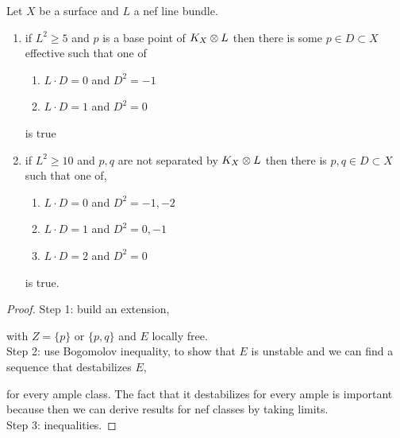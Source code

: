 \documentclass[12pt]{article}
\begin{document}
\begin{theorem}
Let $X$ be a surface and $L$ a nef line bundle.
\begin{enumerate}
\item if $L^2 \ge 5$ and $p$ is a base point of $K_X \otimes L$ then there is some $p \in D \subset X$ effective such that one of
\begin{enumerate}
\item $L \cdot D = 0$ and $D^2 = -1$
\item $L \cdot D = 1$ and $D^2 = 0$
\end{enumerate}
is true

\item if $L^2 \ge 10$ and $p,q$ are not separated by $K_X \otimes L$ then there is $p,q \in D \subset X$ such that one of,
\begin{enumerate}
\item $L \cdot D = 0$ and $D^2 = -1,-2$
\item $L \cdot D = 1$ and $D^2 = 0,-1$
\item $L \cdot D = 2$ and $D^2 = 0$ 
\end{enumerate}
is true.
\end{enumerate}
\end{theorem}

\begin{proof}
Step 1: build an extension,
\begin{center}
\end{center}
with $Z = \{ p \}$ or $\{p, q \}$ and $E$ locally free.
\bigskip\\
Step 2: use Bogomolov inequality, to show that $E$ is unstable and we can find a sequence that destabilizes $E$,
\begin{center}
\end{center}
for every ample class. The fact that it destabilizes for every ample is important because then we can derive results for nef classes by taking limits.
\bigskip\\
Step 3: inequalities. 
\end{proof}
\end{document}
